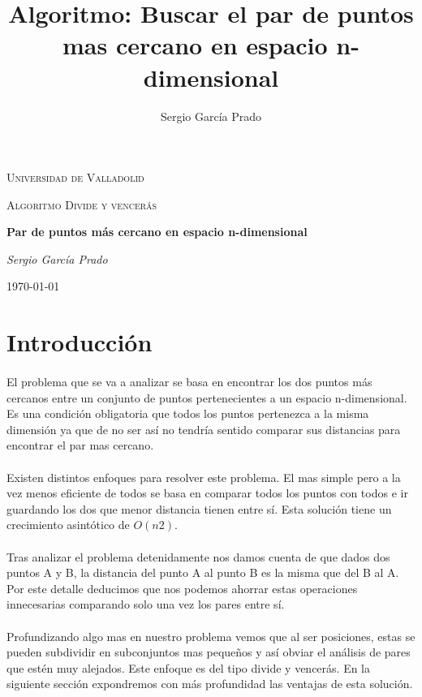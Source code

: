 \documentclass{article}
\title{Algoritmo: Buscar el par de puntos mas cercano en espacio n-dimensional}
\author{Sergio García Prado}
\begin{document}
\begin{titlepage}
	\centering
	{\scshape\LARGE Universidad de Valladolid \par}
	\vspace{1cm}
	{\scshape\Large Algoritmo Divide y vencerás\par}
	\vspace{1.5cm}
	{\huge\bfseries Par de puntos más cercano en espacio n-dimensional\par}
	\vspace{2cm}
	{\Large\itshape Sergio García Prado\par}


	{\large \today\par}
\end{titlepage}

\section{Introducción}

	\paragraph{}
	El problema que se va a analizar se basa en encontrar los dos puntos más cercanos entre un conjunto de puntos pertenecientes a un espacio n-dimensional. Es una condición obligatoria que todos los puntos pertenezca a la misma dimensión ya que de no ser así no tendría sentido comparar sus distancias para encontrar el par mas cercano.

	\paragraph{}
	Existen distintos enfoques para resolver este problema. El mas simple pero a la vez menos eficiente de todos se basa en comparar todos los puntos con todos e ir guardando los dos que menor distancia tienen entre sí. Esta solución tiene un crecimiento asintótico de $O(n2)$.
	
	\paragraph{}
	Tras analizar el problema detenidamente nos damos cuenta de que dados dos puntos A y B, la distancia del punto A al punto B es la misma que del B al A. Por este detalle deducimos que nos podemos ahorrar estas operaciones innecesarias comparando solo una vez los pares entre sí.
	\paragraph{}
	Profundizando algo mas en nuestro problema vemos que al ser posiciones, estas se pueden subdividir en subconjuntos mas pequeños y así obviar el análisis de pares que estén muy alejados. Este enfoque es del tipo divide y vencerás. En la siguiente sección expondremos con más profundidad las ventajas de esta solución.
\end{document}
